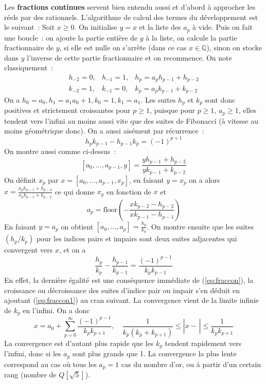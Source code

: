 \documentclass[a4paper,11pt]{article}
\newcommand{\Q}{{\mathbb{Q}}}
\begin{document}
Les {\bf fractions continues} 
 servent bien entendu aussi et d'abord \`a approcher les
r\'eels par des rationnels.
L'algorithme de calcul des termes du d\'eveloppement est le suivant~:
Soit $x\geq0$. On initialise $y=x$ et la liste des $a_p$ \`a vide. 
Puis on fait une boucle~: on ajoute la partie enti\`ere de $y$ \`a la
liste, on calcule la partie fractionnaire de $y$, si elle est nulle on
s'arr\^ete (dans ce cas $x\in \Q$),
sinon on stocke dans $y$ l'inverse de cette partie fractionnaire et on recommence.
On note classiquement~:
\begin{eqnarray} h_{-2}=0, & h_{-1}=1, & h_p=a_p h_{p-1}+h_{p-2}\\
k_{-2}=1, & k_{-1}=0, & k_p=a_p k_{p-1}+k_{p-2}
\end{eqnarray}
On a $h_0=a_0, h_1=a_1 a_0+1, k_0=1, k_1=a_1$.
Les suites $h_p$ et $k_p$ sont donc positives et strictement croissantes pour $p
\geq 1$, puisque pour $p \geq 1$, $a_p\geq 1$, elles tendent vers
l'infini au moins aussi vite que des suites de Fibonacci (\`a vitesse
au moins g\'eom\'etrique donc).
On a aussi ais\'ement par r\'ecurrence~:
\begin{equation} \label{eq:fraccon}
 h_p k_{p-1} - h_{p-1}k_p=(-1)^{p+1}
\end{equation}
On montre aussi comme ci-dessus~:
$$ [a_0,...,a_{p-1},y]=\frac{yh_{p-1}+h_{p-2}}{yk_{p-1}+k_{p-2}}$$
On d\'efinit $x_p$ par $x=[a_0,...,a_{p-1},x_p]$, en faisant $y=x_p$
on a alors $x=\frac{x_ph_{p-1}+h_{p-2}}{x_p k_{p-1}+k_{p-2}}$ ce qui
donne $x_p$ en fonction de $x$ et
$$ a_p=\mbox{floor}\left( - \frac{xk_{p-2}-h_{p-2}}{xk_{p-1}-h_{p-1}} \right)$$
En faisant $y=a_p$ on obtient $[a_0,...,a_p]=\frac{h_p}{k_p}$.
On montre ensuite que les suites $(h_p/k_p)$ pour les indices pairs et impairs sont deux
suites adjacentes qui convergent vers $x$, et on a
\begin{equation} \label{eq:fraccon1}
\frac{h_p}{k_p} - \frac{h_{p-1}}{k_{p-1}} = \frac{(-1)^{p-1}}{k_p
  k_{p-1}}
\end{equation}
En effet, la derni\`ere \'egalit\'e est une cons\'equence imm\'ediate
de (\ref{eq:fraccon}), la croissance ou d\'ecroissance des suites
d'indice pair ou impair s'en d\'eduit en ajoutant (\ref{eq:fraccon1}) au cran
suivant. La convergence vient de la
limite infinie de $k_p$ en l'infini.
On a donc
$$ x=a_0+\sum_{p=0}^\infty \frac{(-1)^{p-1}}{k_p k_{p+1}}, 
\quad \frac{1}{k_p(k_p+k_{p+1})} \leq |x-\frac{}{}| \leq \frac{1}{k_p
  k_{p+1}}$$
La convergence est d'autant plus rapide que les $k_p$ tendent
rapidement vers l'infini, donc si les $a_p$ sont plus grands que 1.
La convergence la plus lente correspond au cas o\`u tous les $a_p=1$
cas du nombre d'or, ou \`a partir d'un certain rang (nombre de $Q[\sqrt{5}]$).
\end{document}
